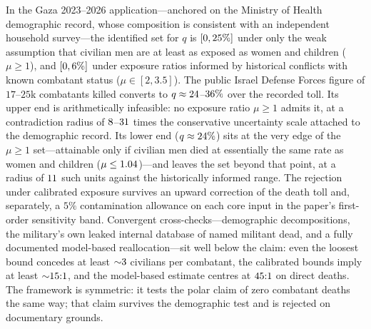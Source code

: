 In the Gaza 2023--2026 application---anchored on the Ministry of Health demographic record, whose composition is consistent with an independent household survey---the identified set for $q$ is $[0,25{}\%]$ under only the weak assumption that civilian men are at least as exposed as women and children ($\mu\ge 1$), and $[0,6{}\%]$ under exposure ratios informed by historical conflicts with known combatant status ($\mu\in[2,3.5]$). The public Israel Defense Forces figure of $17$--$25$k combatants killed converts to $q\approx 24{}$--$36{}\%$ over the recorded toll. Its upper end is arithmetically infeasible: no exposure ratio $\mu\ge 1$ admits it, at a contradiction radius of $8{}$--$31{}$ times the conservative uncertainty scale attached to the demographic record. Its lower end ($q\approx 24{}\%$) sits at the very edge of the $\mu\ge 1$ set---attainable only if civilian men died at essentially the same rate as women and children ($\mu\le 1.04{}$)---and leaves the set beyond that point, at a radius of $11{}$ such units against the historically informed range. The rejection under calibrated exposure survives an upward correction of the death toll and, separately, a $5\%$ contamination allowance on each core input in the paper's first-order sensitivity band. Convergent cross-checks---demographic decompositions, the military's own leaked internal database of named militant dead, and a fully documented model-based reallocation---sit well below the claim: even the loosest bound concedes at least ${\sim}3{}$ civilians per combatant, the calibrated bounds imply at least ${\sim}15{}{:}1$, and the model-based estimate centres at $45{}{:}1$ on direct deaths. The framework is symmetric: it tests the polar claim of zero combatant deaths the same way; that claim survives the demographic test and is rejected on documentary grounds.
